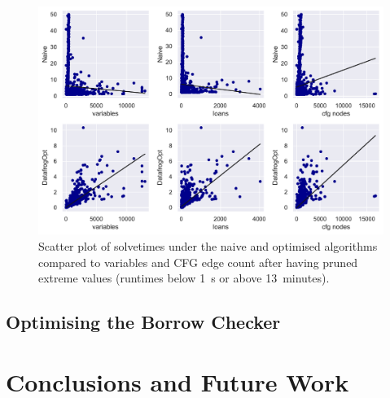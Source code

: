 \documentclass[11pt,a4paper,twoside,openany]{report}
\newcommand{\fixme}[1] {{\color{red}#1}}
\begin{document}
\begin{figure}
  \includegraphics[width=0.9\linewidth]{Graphs/corr_scatter.pdf}
  \caption{Scatter plot of solvetimes under the naive and optimised algorithms
    compared to variables and CFG edge count after having pruned extreme values
    (runtimes below 1~s or above 13~minutes).}
  \label{fig:input-scatter}
\end{figure}


\section{Optimising the Borrow Checker}\label{sec:optim-borr-check}



\chapter{Conclusions and Future Work}\label{cha:conclusions}


\printbibliography[heading=bibintoc]
\end{document}

